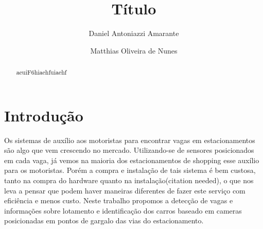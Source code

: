 \documentclass[a4paper,ordem=alf]{abntex2}
\begin{document}
\title{Título}

\author{Daniel Antoniazzi Amarante \and Matthias Oliveira de Nunes}


\maketitle





\begin{abstract}
 aeuiF6hiaehfuiaehf
\end{abstract}

\listoffigures

\listoftables

\tableofcontents{}

\chapter{Introdução}

Os sistemas de auxílio aos motoristas para encontrar vagas em estacionamentos
são algo que vem crescendo no mercado. Utilizando-se de sensores posicionados em
cada vaga, já vemos na maioria dos estacionamentos de shopping esse auxílio para
os motoristas. Porém a compra e instalação de tais sistema é bem custosa, tanto
na compra do hardware quanto na instalação(citation needed), o que nos leva a
pensar que podem haver maneiras diferentes de fazer este serviço com eficiência
e menos custo. Neste trabalho propomos a detecção de vagas e informações sobre
lotamento e identificação dos carros baseado em cameras posicionadas em pontos
de gargalo das vias do estacionamento. 




\end{document}
